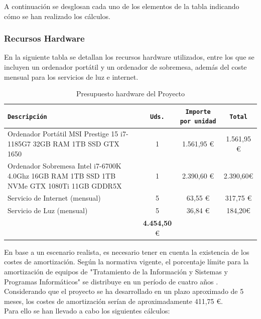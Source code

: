 A continuación se desglosan cada uno de los elementos de la tabla indicando cómo se han realizado los cálculos.

\subsubsection*{Recursos Hardware}

En la siguiente tabla se detallan los recursos hardware utilizados, entre los que se incluyen un ordenador portátil y un ordenador de sobremesa, además del coste mensual para los servicios de luz e internet.

\begin{table}[H]
    \centering
    \footnotesize
    \begin{tabularx}{\linewidth}{|>{\raggedright\arraybackslash}X|c|c|c|}
    \hline
    \rowcolor{graylight}\texttt{Descripción} & \texttt{Uds.} & \texttt{Importe por unidad} & \texttt{Total} \\
    \hline
    Ordenador Portátil MSI Prestige 15 i7-1185G7 32GB RAM 1TB \gls{SSD} \gls{GTX} 1650 & 1 & 1.561,95 \euro & 1.561,95 \euro \\
    \hline
    Ordenador Sobremesa Intel i7-6700K 4.0Ghz 16GB RAM 1TB \gls{SSD} 1TB \gls{NVMe} \gls{GTX} 1080Ti 11GB \gls{GDDR}5X & 1 & 2.390,60 \euro & 2.390,60€ \\
    \hline
    Servicio de Internet (mensual) & 5 & 63,55 \euro& 317,75 \euro\\
    \hline
    Servicio de Luz (mensual) & 5 & 36,84 \euro & 184,20€ \\
    \hline
    \multicolumn{3}{|r|}{\textbf{Coste total}} & \textbf{4.454,50} \euro \\
    \hline
    \end{tabularx}
    \caption{Presupuesto hardware del Proyecto}
    \label{tab:presupuesto}
\end{table}

En base a un escenario realista, es necesario tener en cuenta la existencia de los costes de amortización. Según la normativa vigente, el porcentaje límite para la amortización de equipos de "Tratamiento de la Información y Sistemas y Programas Informáticos" se distribuye en un período de cuatro años \cite{fernandez2023amortizacion}. Considerando que el proyecto se ha desarrollado en un plazo aproximado de 5 meses, los costes de amortización serían de aproximadamente 411,75 \euro. \\

Para ello se han llevado a cabo los siguientes cálculos:


